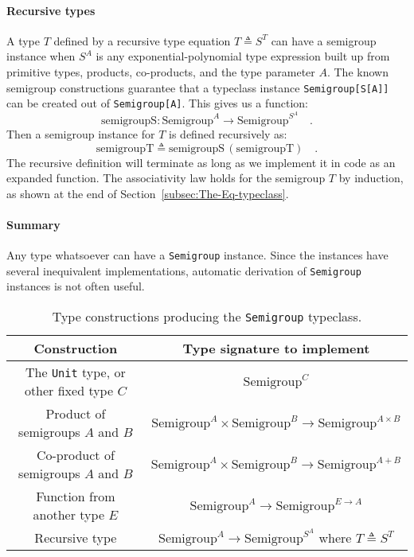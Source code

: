 \paragraph{Recursive types}

A type $T$ defined by a recursive type equation $T\triangleq S^{T}$
can have a semigroup instance when $S^{A}$ is any exponential-polynomial
type expression built up from primitive types, products, co-products,
and the type parameter $A$. The known semigroup constructions guarantee
that a typeclass instance \lstinline!Semigroup[S[A]]! can be created
out of \lstinline!Semigroup[A]!. This gives us a function:
\[
\text{semigroupS}:\text{Semigroup}^{A}\rightarrow\text{Semigroup}^{S^{A}}\quad.
\]
Then a semigroup instance for $T$ is defined recursively as:
\[
\text{semigroupT}\triangleq\text{semigroupS}\,(\text{semigroupT})\quad.
\]
The recursive definition will terminate as long as we implement it
in code as an expanded function. The associativity law holds for the
semigroup $T$ by induction, as shown at the end of Section~\ref{subsec:The-Eq-typeclass}.

\paragraph{Summary}

Any type whatsoever can have a \lstinline!Semigroup! instance. Since
the instances have several inequivalent implementations, automatic
derivation of \lstinline!Semigroup! instances is not often useful.

\begin{table}
\begin{centering}
\begin{tabular}{|c|c|}
\hline 
\textbf{\footnotesize{}Construction} & \textbf{\footnotesize{}Type signature to implement}\tabularnewline
\hline 
\hline 
{\footnotesize{}The }\lstinline!Unit!{\footnotesize{} type, or other
fixed type $C$} & {\footnotesize{}$\text{Semigroup}^{C}$}\tabularnewline
\hline 
{\footnotesize{}Product of semigroups $A$ and $B$} & {\footnotesize{}$\text{Semigroup}^{A}\times\text{Semigroup}^{B}\rightarrow\text{Semigroup}^{A\times B}$}\tabularnewline
\hline 
{\footnotesize{}Co-product of semigroups $A$ and $B$} & {\footnotesize{}$\text{Semigroup}^{A}\times\text{Semigroup}^{B}\rightarrow\text{Semigroup}^{A+B}$}\tabularnewline
\hline 
{\footnotesize{}Function from another type $E$} & {\footnotesize{}$\text{Semigroup}^{A}\rightarrow\text{Semigroup}^{E\rightarrow A}$}\tabularnewline
\hline 
{\footnotesize{}Recursive type} & {\footnotesize{}$\text{Semigroup}^{A}\rightarrow\text{Semigroup}^{S^{A}}$
where $T\triangleq S^{T}$}\tabularnewline
\hline 
\end{tabular}
\par\end{centering}
\caption{Type constructions producing the \lstinline!Semigroup! typeclass.\label{tab:Type-constructions-for-semigroup}}
\end{table}



